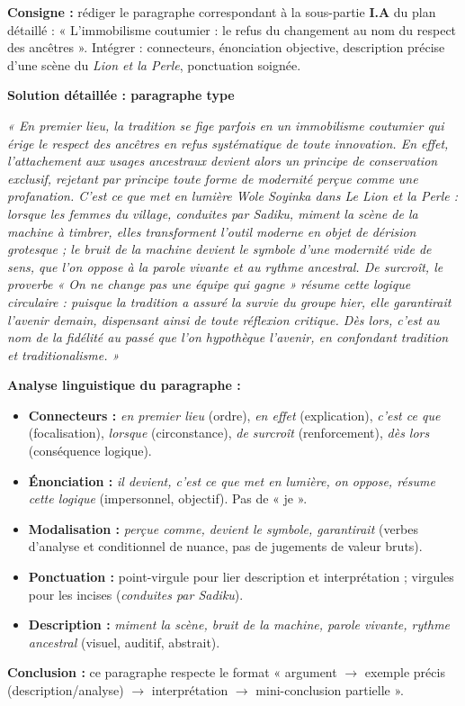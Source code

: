 \documentclass[11pt]{article}
\begin{document}
\begin{exoresolu}
\textbf{Consigne :} rédiger le paragraphe correspondant à la sous-partie \textbf{I.A} du plan détaillé : « L'immobilisme coutumier : le refus du changement au nom du respect des ancêtres ». Intégrer : connecteurs, énonciation objective, description précise d'une scène du \emph{Lion et la Perle}, ponctuation soignée.

\tcblower
\textbf{Solution détaillée : paragraphe type}

\emph{« En premier lieu, la tradition se fige parfois en un immobilisme coutumier qui érige le respect des ancêtres en refus systématique de toute innovation. En effet, l'attachement aux usages ancestraux devient alors un principe de conservation exclusif, rejetant par principe toute forme de modernité perçue comme une profanation. C'est ce que met en lumière Wole Soyinka dans \emph{Le Lion et la Perle} : lorsque les femmes du village, conduites par Sadiku, miment la scène de la machine à timbrer, elles transforment l'outil moderne en objet de dérision grotesque ; le bruit de la machine devient le symbole d'une modernité vide de sens, que l'on oppose à la parole vivante et au rythme ancestral. De surcroît, le proverbe « On ne change pas une équipe qui gagne » résume cette logique circulaire : puisque la tradition a assuré la survie du groupe hier, elle garantirait l'avenir demain, dispensant ainsi de toute réflexion critique. Dès lors, c'est au nom de la fidélité au passé que l'on hypothèque l'avenir, en confondant tradition et traditionalisme. »}

\textbf{Analyse linguistique du paragraphe :}
\begin{itemize}
    \item \textbf{Connecteurs :} \emph{en premier lieu} (ordre), \emph{en effet} (explication), \emph{c'est ce que} (focalisation), \emph{lorsque} (circonstance), \emph{de surcroît} (renforcement), \emph{dès lors} (conséquence logique).
    \item \textbf{Énonciation :} \emph{il devient, c'est ce que met en lumière, on oppose, résume cette logique} (impersonnel, objectif). Pas de « je ».
    \item \textbf{Modalisation :} \emph{perçue comme, devient le symbole, garantirait} (verbes d'analyse et conditionnel de nuance, pas de jugements de valeur bruts).
    \item \textbf{Ponctuation :} point-virgule pour lier description et interprétation ; virgules pour les incises (\emph{conduites par Sadiku}).
    \item \textbf{Description :} \emph{miment la scène, bruit de la machine, parole vivante, rythme ancestral} (visuel, auditif, abstrait).
\end{itemize}
\textbf{Conclusion :} ce paragraphe respecte le format « argument $\rightarrow$ exemple précis (description/analyse) $\rightarrow$ interprétation $\rightarrow$ mini-conclusion partielle ».
\end{exoresolu}
\end{document}
